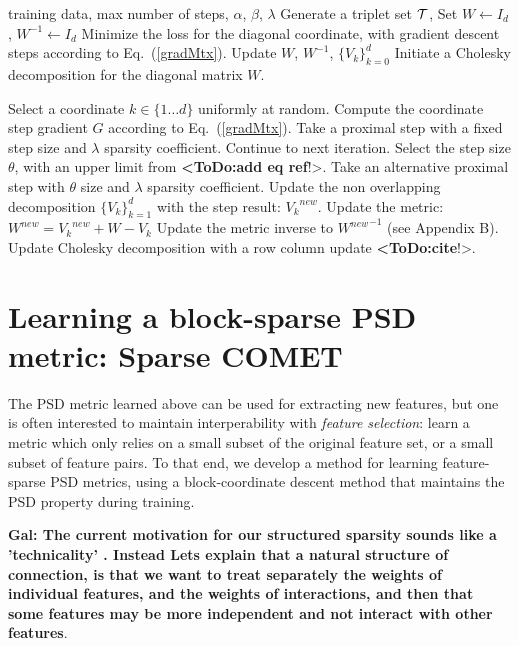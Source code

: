 \documentclass[twoside,11pt]{article}
\newcommand\todo[1]{\textbf{<ToDo:#1}!>}
\newcommand\mat[1]{{#1}}
\newcommand{\W}{\mat{W}}
\newcommand{\newW}{{\mat{W^{new}}}}
\newcommand{\Vk}{\mat{V_k}}
\newcommand{\Vg}{\{\Vk\}_{k=0}^{d}} %
\newcommand{\Vgrc}{\{\Vk\}_{k=1}^{d}} %
\renewcommand{\eqref}[1]{Eq.~(\ref{#1})}
\begin{document}
\begin{algorithm}[t]
   \caption{Sparse COMET \todo{FINISH}}
   \label{alg:spcomet}
\begin{algorithmic}[1]
    training data, max number of steps, $\alpha$, $\beta$, $\lambda$
   \STATE Generate a triplet set $\cal{T}$, Set  $\W  \leftarrow I_d$, $\W^{-1}  \leftarrow I_d$
   \STATE Minimize the loss for the diagonal coordinate, with gradient descent steps according to  \eqref{gradMtx}.
   \STATE Update $\W$, $\W^{-1}$, $\Vg$
    \STATE Initiate a Cholesky decomposition for the diagonal matrix $\W$.
    
   \REPEAT 
   \STATE Select a coordinate $k \in \{1 \ldots d\}$ uniformly at random.
   \STATE Compute the coordinate step gradient $\mat{G}$ according to \eqref{gradMtx}.
   \STATE Take a proximal step with a fixed step size and $\lambda$ sparsity coefficient.
     \STATE Continue to next iteration.
   \ELSE 
      \STATE Select the step size $\theta$, with an upper limit from \todo{add eq ref}.
       \STATE Take an alternative proximal step with $\theta$ size and $\lambda$ sparsity coefficient.
      \STATE Update the non overlapping decomposition $\Vgrc$ with the step result: $\Vk^{new}$.
      \STATE Update the metric: $\newW = \Vk^{new} + \W - \Vk$
       \STATE Update the metric inverse to $\newW^{-1}$ (see Appendix B).
       \STATE Update Cholesky decomposition with a row column update \todo{cite}.
    \ENDIF
\end{algorithmic}
\end{algorithm}

\section{Learning a block-sparse PSD metric: Sparse COMET}
The PSD metric learned above can be used for extracting new features, but one is often interested to maintain interperability with \emph{feature selection}: learn a metric which only relies on a small subset of the original feature set, or a small subset of feature pairs. To that end, we develop a method for learning feature-sparse PSD metrics, using a block-coordinate descent method that maintains the PSD property during  training.


{\bf Gal: The current motivation  for our structured sparsity sounds like a 'technicality' . Instead Lets explain that a natural structure of connection, is that we want to treat separately the weights of individual features, and the weights of interactions, and then that some features may be more independent and not interact with other features}. 
\end{document}
